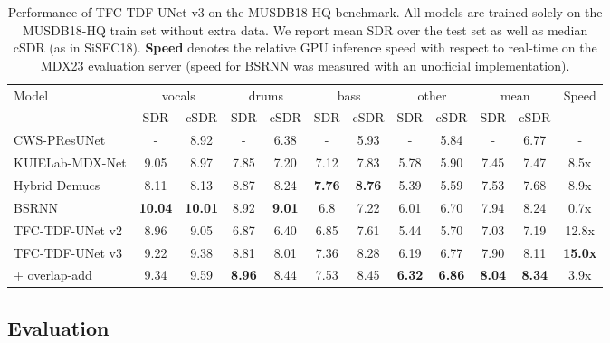 \documentclass[10pt]{article}
\begin{document}
\begingroup
\setlength{\tabcolsep}{5pt}
\renewcommand{\arraystretch}{1.0}
\begin{table*}[t]
\centering
\begin{tabular}{l|cc|cc|cc|cc|cc|c}
\hline\hline
\multirow{2}{*}{\centering Model} & \multicolumn{2}{c|}{vocals} & \multicolumn{2}{c|}{drums} & \multicolumn{2}{c|}{bass} & \multicolumn{2}{c|}{other} & \multicolumn{2}{c|}{mean} & \multirow{2}{*}{\centering Speed}\\
\cline{2-11}
 & SDR  & cSDR & SDR  & cSDR & SDR  & cSDR & SDR  & cSDR & SDR  & cSDR \\
\hline
CWS-PResUNet\cite{cwsunet} 
& - & 8.92 & - & 6.38 & - & 5.93 & - & 5.84 & - & 6.77 & - \\ 
KUIELab-MDX-Net\cite{mdxnet} 
& 9.05 & 8.97 & 7.85 & 7.20 & 7.12 & 7.83 & 5.78 & 5.90 & 7.45 & 7.47 & 8.5x \\
Hybrid Demucs\cite{hdemucs} 
& 8.11 & 8.13 & 8.87 & 8.24 & \textbf{7.76} & \textbf{8.76} & 5.39 & 5.59 & 7.53 & 7.68 & 8.9x \\
BSRNN\cite{bsrnn} 
& \textbf{10.04} & \textbf{10.01} & 8.92 & \textbf{9.01} & 6.8 & 7.22 & 6.01 & 6.70 & 7.94 & 8.24 & 0.7x \\
\hline
TFC-TDF-UNet v2\cite{mdxnet} 
& 8.96 & 9.05 & 6.87 & 6.40 & 6.85 & 7.61 & 5.44 & 5.70 & 7.03 & 7.19 & 12.8x \\
TFC-TDF-UNet v3 
& 9.22 & 9.38 & 8.81 & 8.01 & 7.36 & 8.28 & 6.19 & 6.77 & 7.90 & 8.11 & \textbf{15.0x} \\
+ overlap-add 
& 9.34 & 9.59 & \textbf{8.96} & 8.44 & 7.53 & 8.45 & \textbf{6.32} & \textbf{6.86} & \textbf{8.04} & \textbf{8.34} & 3.9x \\


\hline\hline
\end{tabular}
\caption{Performance of TFC-TDF-UNet v3 on the MUSDB18-HQ benchmark. All models are trained solely on the MUSDB18-HQ train set without extra data. We report mean SDR over the test set as well as median cSDR (as in SiSEC18\cite{sisec18}). 
\textbf{Speed} denotes the relative GPU inference speed with respect to real-time on the MDX23 evaluation server 
(speed for BSRNN was measured with an unofficial implementation\protect\footnotemark[2]).}
\label{tab:sota}
\end{table*}
\endgroup



\subsection{Evaluation}
\label{ssec:v3_performance}
\end{document}
